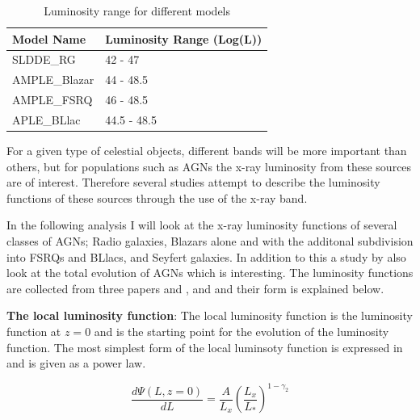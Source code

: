 \documentclass{article}
\begin{document}
\begin{table}
    \centering
    \begin{tabular}{ll}
    \hline
     Model Name   & Luminosity Range (Log(L))  \\
    \hline
     SLDDE\_RG     & 42 - 47            \\
     AMPLE\_Blazar & 44 - 48.5          \\
     AMPLE\_FSRQ   & 46 - 48.5          \\
     APLE\_BLlac   & 44.5 - 48.5        \\
    \hline

\end{tabular}
\caption{Luminosity range for different models}

\label{tab:lum_range}

\end{table}



For a given type of celestial objects, different bands will be more important than others, but for populations such as AGNs
 the x-ray luminosity from these sources are of interest. 
Therefore several studies attempt to describe the luminosity functions of these sources through the use of the x-ray band. 

In the following analysis I will look at the x-ray luminosity functions of several classes of AGNs; Radio galaxies, Blazars alone and with the additonal subdivision into FSRQs and BLlacs, and Seyfert galaxies. In addition to this 
a study by \cite{Ueda_2014} also look at the total evolution of AGNs which is interesting. The luminosity functions are collected from three papers \cite{Ajello_2009} and \cite{Silverman_2008}, and \cite{Ueda_2014} and their form is explained below.

\textbf{The local luminosity function}:
The local luminosity function is the luminosity function at $z=0$ and is the starting point for the evolution of the luminosity function.
The most simplest form of the local luminsoty function is expressed in \cite{Ajello_2009} and is given as a power law.

\begin{equation}
    \frac{d\Psi(L,z=0)}{dL} = \frac{A}{L_x} \left( \frac{L_x}{L_*}\right)^{1-\gamma_2}
\end{equation}
\end{document}
